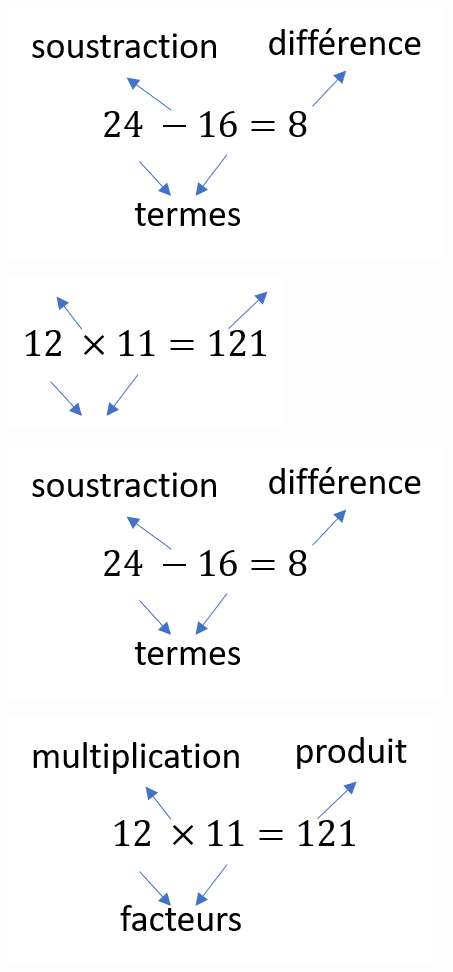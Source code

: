 \documentclass[xcolor={dvipsnames}]{beamer}
\begin{document}
\begin{frame}
	\begin{center}
		\includegraphics[scale=0.8]{difference}
	\end{center}
	
	\vspace*{1cm}
	\begin{center}
		\includegraphics[scale=0.8]{produit2}
	\end{center}
\end{frame}

\begin{frame}
	\begin{center}
		\includegraphics[scale=0.8]{difference}
	\end{center}

	\begin{center}
		\includegraphics[scale=0.8]{produit}
	\end{center}
\end{frame}
\end{document}
